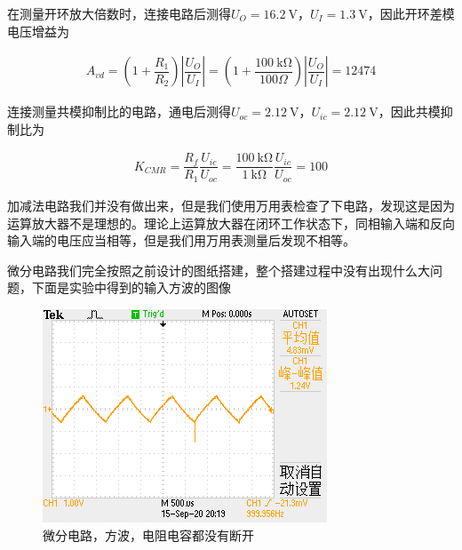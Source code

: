 \documentclass{ctexart}
\newcommand{\si}[1]{\  \mathrm{#1}}
\begin{document}
在测量开环放大倍数时，连接电路后测得$U_O = 16.2 \si{V}$，$U_I = 1.3 \si{V}$，因此开环差模电压增益为

\begin{equation*}
  \begin{aligned}
    A_{vd} = \left( 1 + \dfrac{R_1}{R_2}  \right) \left| \dfrac{U_O}{U_I}  \right| = \left( 1 + \dfrac{100 \si{k \Omega}}{100 \Omega}  \right) \left| \dfrac{U_O}{U_I}  \right| = 12474
  \end{aligned}
\end{equation*}

连接测量共模抑制比的电路，通电后测得$U_{oc}=2.12 \si{V}$，$U_{ic} = 2.12 \si{V}$，因此共模抑制比为

\begin{equation*}
  \begin{aligned}
    K_{CMR} = \dfrac{R_f}{R_1} \dfrac{U_{ic}}{U_{oc}} = \dfrac{100 \si{k \Omega}}{1 \si{k \Omega}} \dfrac{U_{ic}}{U_{oc}} = 100    
  \end{aligned}
\end{equation*}

加减法电路我们并没有做出来，但是我们使用万用表检查了下电路，发现这是因为运算放大器不是理想的。理论上运算放大器在闭环工作状态下，同相输入端和反向输入端的电压应当相等，但是我们用万用表测量后发现不相等。

微分电路我们完全按照之前设计的图纸搭建，整个搭建过程中没有出现什么大问题，下面是实验中得到的输入方波的图像

\begin{figure}[H]
  \centering
  \includegraphics[width=0.96\linewidth]{电路图像/微分电路/输入方波/方波有电阻有电容}
  \caption{微分电路，方波，电阻电容都没有断开}
\end{figure}
\end{document}

